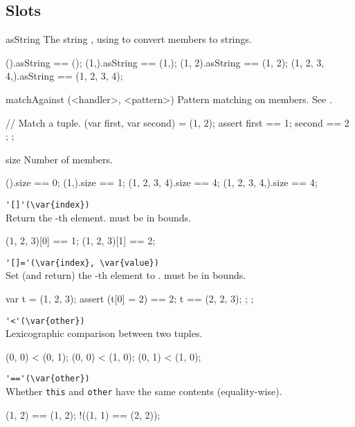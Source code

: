 \subsection{Slots}
\begin{urbiscriptapi}
\item[asString]%
  The string , using
   to convert members to strings.

\begin{urbiassert}
           ().asString == ();
         (1,).asString == (1,);
       (1, 2).asString == (1, 2);
(1, 2, 3, 4,).asString == (1, 2, 3, 4);
\end{urbiassert}


\item[matchAgainst](<handler>, <pattern>)%
  Pattern matching on members.  See .
\begin{urbiscript}
{
  // Match a tuple.
  (var first, var second) = (1, 2);
  assert { first == 1; second == 2 };
};
\end{urbiscript}

\item[size] Number of members.
\begin{urbiassert}
           ().size == 0;
         (1,).size == 1;
 (1, 2, 3, 4).size == 4;
(1, 2, 3, 4,).size == 4;
\end{urbiassert}

\item \lstinline|'[]'(\var{index})|\\
  Return the -th element.   must be in bounds.
\begin{urbiassert}
(1, 2, 3)[0] == 1;
(1, 2, 3)[1] == 2;
\end{urbiassert}

\item \lstinline|'[]='(\var{index}, \var{value})|\\
  Set (and return) the -th element to .
   must be in bounds.
\begin{urbiscript}
{
  var t = (1, 2, 3);
  assert
  {
    (t[0] = 2) == 2;
    t == (2, 2, 3);
  };
};
\end{urbiscript}

\item \lstinline|'<'(\var{other})|\\
  Lexicographic comparison between two tuples.
\begin{urbiassert}
(0, 0) < (0, 1);
(0, 0) < (1, 0);
(0, 1) < (1, 0);
\end{urbiassert}

\item \lstinline|'=='(\var{other})|\\
  Whether \lstinline|this| and \lstinline|other| have the same
  contents (equality-wise).
\begin{urbiassert}
  (1, 2) == (1, 2);
!((1, 1) == (2, 2));
\end{urbiassert}
\end{urbiscriptapi}




